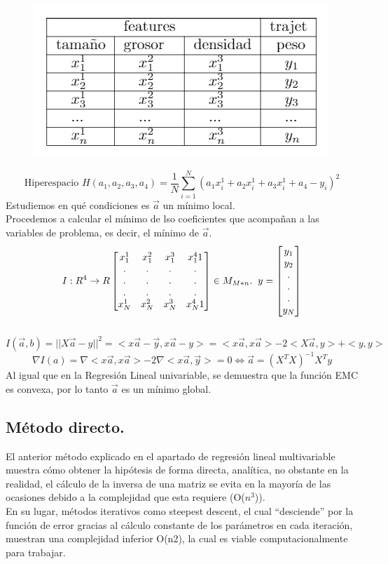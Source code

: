 \documentclass[a4paper,10pt]{article}
\begin{document}
\begin{figure}[H]
\centering
\includegraphics[scale=0.8]{Annotation 2020-03-23 133547}
\end{figure}
 \[\text{Hiperespacio } H(a_{1},a_{2},a_{3},a_{4})=\frac{1}{N}\sum_{i=1}^{N}(a_{1}x_i^1+a_{2}x_i^1+a_{3}x_i^1+a_{4}-y_{i})^2
\]
Estudiemos en qué condiciones es $\vec{a}$ un mínimo local. 
\\Procedemos a calcular el mínimo de lso coeficientes que acompañan a las variables de problema, es decir, el mínimo de $\vec{a}$.
\[I:R^4\rightarrow R \begin{bmatrix}
    x_{1}^1 & x_{1}^2 & x_{1}^3 & x_{1}^4 1 \\
    .&.&.&.\\
    .&.&.&.\\
    .&.&.&.\\
    x_{N}^1 & x_{N}^2 & x_{N}^3 & x_{N}^4 1
\end{bmatrix} \in M_{M*n}. \hspace{0.20cm} y=\begin{bmatrix}y_{1}\\y_{2}\\.\\.\\.\\y_{N}\end{bmatrix}\] \\ \[I(\vec{a},b)=||X\vec{a}-y||^2 = <x\vec{a}-\vec{y},x\vec{a}-y>=<x\vec{a},x\vec{a}>-2<X\vec{a},y>+<y,y>\]
\[\nabla I(a)=\nabla<x\vec{a},x\vec{a}>-2\nabla<x\vec{a},\vec{y}>=0\Leftrightarrow \boxed{ \vec{a}=(X^T X)^{-1} X^T y}\]
Al igual que en la Regresión Lineal univariable, se demuestra que la función EMC es convexa, por lo tanto $\vec{a}$ es un mínimo global.
\subsection{Método directo.}

El anterior método explicado en el apartado de regresión lineal multivariable muestra cómo obtener la hipótesis de forma directa, analítica, no obstante en la realidad, el cálculo de la inversa de una matriz se evita en la mayoría de las ocasiones debido a la complejidad que esta requiere (O($n^3$)).\\
En su lugar, métodos iterativos como steepest descent, el cual “desciende” por la función de error gracias al cálculo constante de los parámetros en cada iteración, muestran una complejidad inferior O(n2), la cual es viable computacionalmente para trabajar. 
\end{document}
